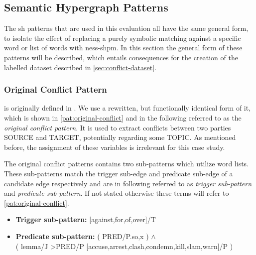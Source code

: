 \documentclass[11pt]{scrreprt}
\let\citef\cite  %
\let\cite\parencite  %
\begin{document}
{%
%


\subsection{Semantic Hypergraph Patterns}
\label{sec:sh-patterns}
The \gls{sh} patterns that are used in this evaluation all have the same general form, to isolate the effect of replacing a purely symbolic matching against a specific word or list of words with \gls{ness-shpm}. In this section the general form of these patterns will be described, which entails consequences for the creation of the labelled dataset described in \cref{sec:conflict-dataset}. 



\subsubsection{Original Conflict Pattern}
 is originally defined in \citef[p.~22]{menezesSemanticHypergraphs2021}. We use a rewritten, but functionally identical form of it, which is shown in \cref{pat:original-conflict} and in the following referred to as the \textit{original conflict pattern}. It is used to extract conflicts between two parties \textsf{SOURCE} and \textsf{TARGET}, potentially regarding some \textsf{TOPIC}. As mentioned before, the assignment of these variables is irrelevant for this case study.

The original conflict patterns contains two sub-patterns which utilize word lists. These sub-patterns match the trigger sub-edge and predicate sub-edge of a candidate edge respectively and are in following referred to as \textit{trigger sub-pattern} and \textit{predicate sub-pattern}. If not stated otherwise these terms will refer to \cref{pat:original-conflict}. 

\begin{itemize}
	\item \textbf{\textsf{Trigger sub-pattern:}} \textsf{[against,for,of,over]/T}
	\item \textbf{\textsf{Predicate sub-pattern:}}
		\textsf{( PRED/P.{so,x} ) \(\wedge\) \\ ( lemma/J >PRED/P [accuse,arrest,clash,condemn,kill,slam,warn]/P )}
\end{itemize}

}
\end{document}
